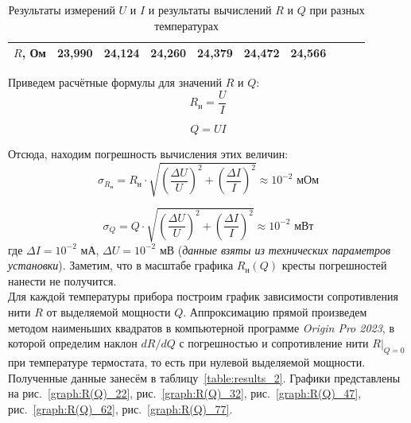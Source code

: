 \documentclass[a4paper, 12pt]{article}
\begin{document}
\begin{table}[H]
\begin{tabular}{|cccccccccc|}
                \multicolumn{1}{|c|}{$R$, Ом} & \multicolumn{1}{c|}{23,990} & \multicolumn{1}{c|}{24,124} & \multicolumn{1}{c|}{24,260} & \multicolumn{1}{c|}{24,379} & \multicolumn{1}{c|}{24,472} & \multicolumn{1}{c|}{24,566} & \multicolumn{1}{c|}{} & \multicolumn{1}{c|}{} & \multicolumn{1}{c|}{} \\ \hline
            \end{tabular}
            \caption{Результаты измерений $U$ и $I$ и результаты вычислений $R$ и $Q$ при разных температурах}
            \label{Данные}
        \end{table}

        \noindent Приведем расчётные формулы для значений $R$ и $Q$:
        \begin{equation}
            R_{\text{н}} = \frac{U}{I}
        \end{equation}

         \begin{equation}
            Q = UI
        \end{equation}

        \noindent Отсюда, находим погрешность вычисления этих величин:
        \begin{equation}
            \sigma_{R_{\text{н}}} = R_{\text{н}} \cdot \sqrt{\left ( \frac{\Delta U}{U}\right)^2 + \left ( \frac{\Delta I}{I}\right)^2} \approx 10^{-2} \text{ мОм}
        \end{equation}

        \begin{equation}
            \sigma_{Q} = Q \cdot \sqrt{\left ( \frac{\Delta U}{U}\right)^2 + \left ( \frac{\Delta I}{I}\right)^2} \approx 10^{-2} \text{ мВт}
        \end{equation}
        \noindent где $\Delta I = 10^{-2} \text{ мА}$, $\Delta U = 10^{-2} \text{ мВ}$ (\textit{данные взяты из технических параметров установки}). Заметим, что в масштабе графика $R_{\text{н}}(Q)$ кресты погрешностей нанести не получится. \\

        \noindent Для каждой температуры прибора построим график зависимости сопротивления нити $R$ от выделяемой мощности $Q$. Аппроксимацию прямой произведем методом наименьших квадратов в компьютерной программе \textit{Origin Pro 2023}, в которой определим наклон $dR/dQ$ с погрешностью и сопротивление нити $R|_{Q = 0}$ при температуре термостата, то есть при нулевой выделяемой мощности. Полученные данные занесём в таблицу~\ref{table:results_2}. Графики представлены на рис.~\ref{graph:R(Q)_22}, рис.~\ref{graph:R(Q)_32}, рис.~\ref{graph:R(Q)_47}, рис.~\ref{graph:R(Q)_62}, рис.~\ref{graph:R(Q)_77}. 
\end{document}
